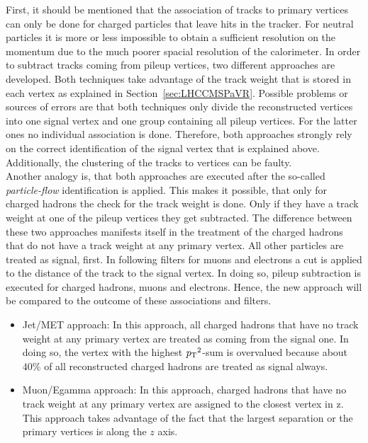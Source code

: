 First, it should be mentioned that the association of tracks to primary vertices can only be done for charged particles that leave hits in the tracker. For neutral particles it is more or less impossible to obtain a sufficient resolution on the momentum due to the much poorer spacial resolution of the calorimeter. In order to subtract tracks coming from pileup vertices, two different approaches are developed. Both techniques take advantage of the track weight that is stored in each vertex as explained in Section~\ref{sec:LHCCMSPaVR}. Possible problems or sources of errors are that both techniques only divide the reconstructed vertices into one signal vertex and one group containing all pileup vertices. For the latter ones no individual association is done. Therefore, both approaches strongly rely on the correct identification of the signal vertex that is explained above. Additionally, the clustering of the tracks to vertices can be faulty. \\
Another analogy is, that both approaches are executed after the so-called \textit{particle-flow} identification is applied. This makes it possible, that only for charged hadrons  the check for the track weight is done.  Only if they have a track weight at one of the pileup vertices they get subtracted. The difference between these two approaches manifests itself in the treatment of the charged hadrons that do not have a track weight at any primary vertex. All other particles are treated as signal, first. In following filters for muons and electrons a cut is applied to the distance of the track to the signal vertex. In doing so, pileup subtraction is executed for charged hadrons, muons and electrons. Hence, the new approach will be compared to the outcome of these associations and filters.

\begin{itemize}
    \item{Jet/MET approach:} In this approach, all charged hadrons that have no track weight at any primary vertex are treated as coming from the signal one. In doing so, the vertex with the highest $p_{\mathrm{T}}{}^{2}$-sum is overvalued because about $40\%$ of all reconstructed charged hadrons are treated as signal always.

\item{Muon/Egamma approach:} In this approach, charged hadrons that have no track weight at any primary vertex are assigned to the closest vertex in z. This approach takes advantage of the fact that the largest separation or the primary vertices is along the $z$ axis.
\end{itemize}

